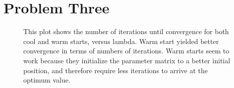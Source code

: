 

\section{Problem Three}

\begin{figure}[h!tbp]
       \caption{This plot shows the number of iterations until convergence for both cool and warm
       starts, versus lambda. Warm start yielded better convergence in terms of
       numbers of iterations. Warm starts seem to work because they initialize
       the parameter matrix to a better initial position, and therefore require
       less iterations to arrive at the optimum value.}
\end{figure}

